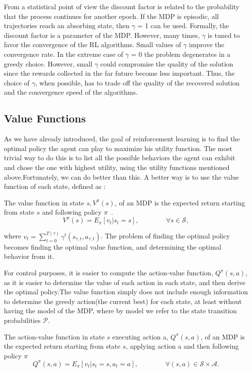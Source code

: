 From a statistical point of view the discount factor is related to the probability that the process continues for another epoch. If the MDP is episodic, \ie all trajectories reach an absorbing state, then $\gamma$ = 1 can be used. Formally, the discount factor is a parameter of the MDP. However, many times, $\gamma$ is tuned to favor the convergence of the RL algorithms. Small values of $\gamma$ improve the convergence rate. In the extreme case of $\gamma$ = 0 the problem degenerates in a greedy choice. However, small $\gamma$ could compromise the quality of the solution since the rewards collected in the far future become less important. Thus, the choice of $\gamma$, when possible, has to trade off
the quality of the recovered solution and the convergence speed of the algorithms.
\subsection*{Value Functions}
As we have already introduced, the goal of reinforcement learning is to find the optimal policy the agent can play to maximize his utility function. The most trivial way to do this is to list all the possible behaviors the agent can exhibit and chose the one with highest utility, using the utility functions mentioned above.Fortunately, we can do better than this.
A better way is to use the value function of each state, defined as :
\begin{definition}
The value function in state $s, V^\pi(s)$, of an MDP is the expected return starting from state $s$ and following policy $\pi$~\cite{Sutton:1998:IRL:551283}.
\begin{equation}
			V^\pi(s)=E_\pi \left[v_t| s_t=s \right], \qquad\qquad \forall s \in \mathcal{S},
\end{equation}
\end{definition}
where $v_t= \sum_{t=0}^{T(\tau)} \gamma^{t}(s_{\tau,t},a_{\tau,t})$. The problem of finding the optimal policy becomes finding the optimal value function, and determining the optimal behavior from it.\par
For control purposes, it is easier to compute the action-value function, $Q^\pi(s,a)$, as it is easier to determine the value of each action in each state, and then derive the optimal policy.The value function simply does not include enough information to determine the greedy action(the current best) for each state, at least without having the model of the MDP, where by model we refer to the state transition probabilities $\mathcal{P}$.
\begin{definition}
	The action-value function in state $s$ executing action a, $Q^{\pi}(s,a)$, of an MDP is the expected return starting from state $s$, applying action a and then following policy $\pi$ ~\cite{Sutton:1998:IRL:551283}
    \begin{equation}
			Q^\pi(s,a)=E_\pi \left[v_t| s_t=s,a_t=a \right], \qquad \qquad  \forall (s,a) \in \mathcal{S}\times \mathcal{A}.
	\end{equation}
\end{definition}
